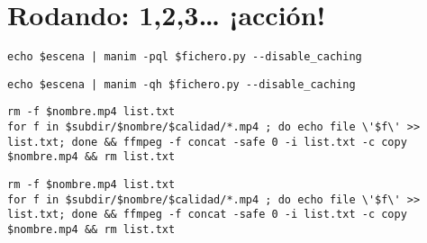 \documentclass[11pt]{article}
\begin{document}
\section{Rodando: 1,2,3\dots{} ¡acción!}
\label{sec:org6f856e9}

\begin{verbatim}
echo $escena | manim -pql $fichero.py --disable_caching
\end{verbatim}


\begin{verbatim}
echo $escena | manim -qh $fichero.py --disable_caching
\end{verbatim}


\begin{verbatim}
rm -f $nombre.mp4 list.txt
for f in $subdir/$nombre/$calidad/*.mp4 ; do echo file \'$f\' >> list.txt; done && ffmpeg -f concat -safe 0 -i list.txt -c copy $nombre.mp4 && rm list.txt
\end{verbatim}

\begin{verbatim}
rm -f $nombre.mp4 list.txt
for f in $subdir/$nombre/$calidad/*.mp4 ; do echo file \'$f\' >> list.txt; done && ffmpeg -f concat -safe 0 -i list.txt -c copy $nombre.mp4 && rm list.txt
\end{verbatim}
\end{document}
